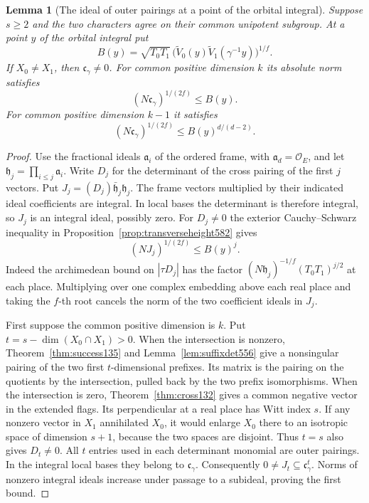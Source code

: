\documentclass[a4paper,11pt]{article}
\newtheorem{lemma}[proposition]{Lemma}
\theoremstyle{definition}
\theoremstyle{remark}
\numberwithin{equation}{section}
\begin{document}
\begin{lemma}[The ideal of outer pairings at a point of the orbital integral]
\leavevmode\label{lem:contentdepth639}
Suppose \(s\ge2\) and the two characters agree on their common
unipotent subgroup. At a point \(y\) of the orbital integral put
\[
   B(y)=\sqrt{T_0T_1}\,
     \big(\widetilde V_0(y)\widetilde V_1(\gamma^{-1}y)\big)^{1/f}.
\]
If \(X_0\ne X_1\), then \(\mathfrak c_\gamma\ne0\). For common
positive dimension \(k\) its absolute norm satisfies
\[
               (N\mathfrak c_\gamma)^{1/(2f)}\le B(y).
\]
For common positive dimension \(k-1\) it satisfies
\[
               (N\mathfrak c_\gamma)^{1/(2f)}
                              \le B(y)^{d/(d-2)} .
\]
\end{lemma}
\begin{proof}
Use the fractional ideals \(\mathfrak a_i\) of the ordered frame,
with \(\mathfrak a_d=\mathcal O_E\), and let
\(\mathfrak h_j=\prod_{i\le j}\mathfrak a_i\).
Write \(D_j\) for the determinant of the cross pairing of the first
\(j\) vectors. Put \(J_j=(D_j)\bar{\mathfrak h}_j\mathfrak h_j\).
The frame vectors multiplied by their indicated ideal coefficients
are integral. In local bases the determinant is therefore integral,
so \(J_j\) is an integral ideal, possibly zero. For \(D_j\ne0\)
the exterior Cauchy--Schwarz inequality in
Proposition~\ref{prop:transverseheight582} gives
\[
                   (N J_j)^{1/(2f)}\le B(y)^j .
\]
Indeed the archimedean bound on \(|\tau D_j|\) has the factor
\((N\mathfrak h_j)^{-1/f}(T_0T_1)^{j/2}\) at each place.
Multiplying over one complex embedding above each real place and
taking the \(f\)-th root cancels the norm of the two coefficient
ideals in \(J_j\).

First suppose the common positive dimension is \(k\). Put
\(t=s-\dim(X_0\cap X_1)>0\). When the intersection is nonzero,
Theorem~\ref{thm:success135} and Lemma~\ref{lem:suffixdet556}
give a nonsingular pairing of the two first \(t\)-dimensional
prefixes. Its matrix is the pairing on the quotients by the
intersection, pulled back by the two prefix isomorphisms. When the
intersection is zero, Theorem~\ref{thm:cross132} gives a common
negative vector in the extended flags. Its perpendicular at a real
place has Witt index \(s\). If any nonzero vector in \(X_1\)
annihilated \(X_0\), it would enlarge \(X_0\) there to an isotropic
space of dimension \(s+1\), because the two spaces are disjoint.
Thus \(t=s\) also gives \(D_t\ne0\). All \(t\) entries used in each
determinant monomial are outer pairings. In the integral local
bases they belong to \(\mathfrak c_\gamma\). Consequently
\(0\ne J_t\subseteq\mathfrak c_\gamma^t\). Norms of nonzero
integral ideals increase under passage to a subideal, proving the
first bound.


\end{proof}
\end{document}
